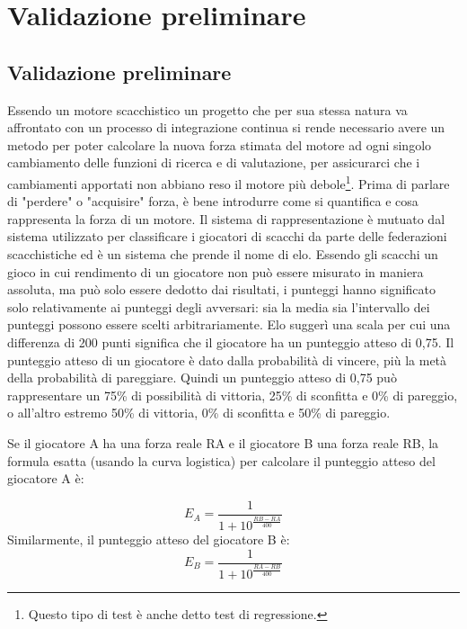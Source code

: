 \chapter{Validazione preliminare} %
%

\newpage
\section*{Validazione preliminare}
Essendo un motore scacchistico un progetto che per sua stessa natura va affrontato con un processo di integrazione continua si rende necessario avere un metodo 
per poter calcolare la nuova forza stimata del motore  ad ogni singolo cambiamento  delle funzioni di ricerca e di valutazione, per assicurarci che i cambiamenti apportati non abbiano reso il motore più debole\footnote{Questo tipo di test è anche detto test di regressione.}.
Prima di parlare di "perdere" o "acquisire" forza, è bene introdurre come si quantifica e cosa rappresenta la forza di un motore. Il sistema di rappresentazione è mutuato dal sistema utilizzato per classificare i 
giocatori di scacchi da parte delle federazioni scacchistiche ed è un sistema che prende il nome di elo. Essendo gli scacchi un gioco in cui  rendimento di un giocatore non può essere misurato in maniera assoluta,
ma può solo essere dedotto dai risultati, i punteggi hanno significato solo relativamente ai punteggi degli avversari: 
sia la media sia l'intervallo dei punteggi possono essere scelti arbitrariamente. Elo suggerì una scala per cui una differenza di 200 punti significa che il giocatore ha un punteggio atteso di 0,75.
Il punteggio atteso di un giocatore è dato dalla probabilità di vincere, più la metà della probabilità di pareggiare. Quindi un punteggio atteso di 0,75 può rappresentare un 75\% di possibilità di vittoria, 
25\% di sconfitta e 0\% di pareggio, o all'altro estremo 50\% di vittoria, 0\% di sconfitta e 50\% di pareggio.

Se il giocatore A ha una forza reale RA e il giocatore B una forza reale RB, la formula esatta (usando la curva logistica) per calcolare il punteggio atteso del giocatore A è:

\begin{equation}  E_{A}={\frac{{1}}{{1+10^\frac{{{RB} - {RA}}}{{400}}}}} \end{equation}
Similarmente, il punteggio atteso del giocatore B è:
\begin{equation}  E_{B}={\frac{{1}}{{1+10^\frac{{{RA} - {RB}}}{{400}}}}} \end{equation}

